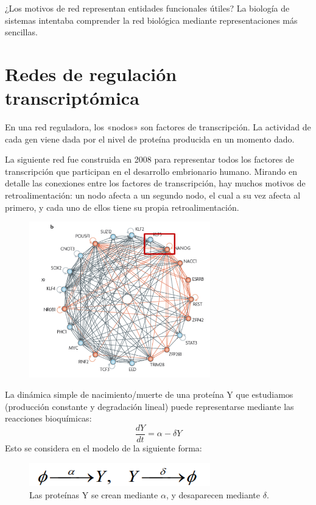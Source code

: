 ¿Los motivos de red representan entidades funcionales útiles? La biología de sistemas intentaba comprender la red biológica mediante representaciones más sencillas. 

\section{Redes de regulación transcriptómica}
En una red reguladora, los «nodos» son factores de transcripción. La actividad de cada gen viene dada por el nivel de proteína producida en un momento dado. 

La siguiente red fue construida en 2008 para representar todos los factores de transcripción que participan en el desarrollo embrionario humano. Mirando en detalle las conexiones entre los factores de transcripción, hay muchos motivos de retroalimentación: un nodo afecta a un segundo nodo, el cual a su vez afecta al primero, y cada uno de ellos tiene su propia retroalimentación. 

\begin{figure}[h]
\centering
\includegraphics[width = 0.7\textwidth]{figs/red-embrionaria.png}
\end{figure}

La dinámica simple de nacimiento/muerte de una proteína Y que estudiamos (producción constante y degradación lineal) puede representarse mediante las reacciones bioquímicas: 
$$\frac{dY}{dt} = \alpha - \delta Y$$
Esto se considera en el modelo de la siguiente forma:
\begin{figure}[h]
\centering
\includegraphics[width = 0.7\textwidth]{figs/reacciones.png}
\caption{Las proteínas Y se crean mediante $\alpha$, y desaparecen mediante $\delta$.}
\end{figure}

